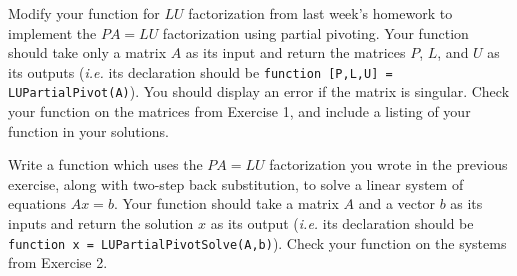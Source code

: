 \documentclass[12pt,fleqn]{exam}
\begin{document}
\begin{questions}

\question Modify your function for $LU$ factorization from last week's homework to implement the $PA = LU$ factorization using partial pivoting. Your function should take only a matrix $A$ as its input and return the matrices $P$, $L$, and $U$ as its outputs (\textit{i.e.} its declaration should be \verb$function [P,L,U] = LUPartialPivot(A)$). You should display an error if the matrix is singular. Check your function on the matrices from Exercise 1, and include a listing of your function in your solutions.

\question Write a function which uses the $PA = LU$ factorization you wrote in the previous exercise, along with two-step back substitution, to solve a linear system of equations $Ax = b$. Your function should take a matrix $A$ and a vector $b$ as its inputs and return the solution $x$ as its output (\textit{i.e.} its declaration should be \verb$function x = LUPartialPivotSolve(A,b)$). Check your function on the systems from Exercise 2.\\[1.5ex]


\end{questions}
\end{document}

